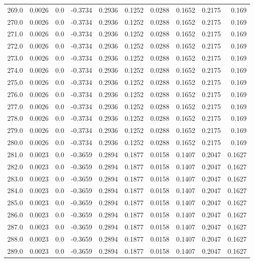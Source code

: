 \begin{longtable}{lrrrrrrrrr}
269.0 & 0.0026 & 0.0 & -0.3734 & 0.2936 & 0.1252 & 0.0288 & 0.1652 & 0.2175 & 0.169 \\
270.0 & 0.0026 & 0.0 & -0.3734 & 0.2936 & 0.1252 & 0.0288 & 0.1652 & 0.2175 & 0.169 \\
271.0 & 0.0026 & 0.0 & -0.3734 & 0.2936 & 0.1252 & 0.0288 & 0.1652 & 0.2175 & 0.169 \\
272.0 & 0.0026 & 0.0 & -0.3734 & 0.2936 & 0.1252 & 0.0288 & 0.1652 & 0.2175 & 0.169 \\
273.0 & 0.0026 & 0.0 & -0.3734 & 0.2936 & 0.1252 & 0.0288 & 0.1652 & 0.2175 & 0.169 \\
274.0 & 0.0026 & 0.0 & -0.3734 & 0.2936 & 0.1252 & 0.0288 & 0.1652 & 0.2175 & 0.169 \\
275.0 & 0.0026 & 0.0 & -0.3734 & 0.2936 & 0.1252 & 0.0288 & 0.1652 & 0.2175 & 0.169 \\
276.0 & 0.0026 & 0.0 & -0.3734 & 0.2936 & 0.1252 & 0.0288 & 0.1652 & 0.2175 & 0.169 \\
277.0 & 0.0026 & 0.0 & -0.3734 & 0.2936 & 0.1252 & 0.0288 & 0.1652 & 0.2175 & 0.169 \\
278.0 & 0.0026 & 0.0 & -0.3734 & 0.2936 & 0.1252 & 0.0288 & 0.1652 & 0.2175 & 0.169 \\
279.0 & 0.0026 & 0.0 & -0.3734 & 0.2936 & 0.1252 & 0.0288 & 0.1652 & 0.2175 & 0.169 \\
280.0 & 0.0026 & 0.0 & -0.3734 & 0.2936 & 0.1252 & 0.0288 & 0.1652 & 0.2175 & 0.169 \\
281.0 & 0.0023 & 0.0 & -0.3659 & 0.2894 & 0.1877 & 0.0158 & 0.1407 & 0.2047 & 0.1627 \\
282.0 & 0.0023 & 0.0 & -0.3659 & 0.2894 & 0.1877 & 0.0158 & 0.1407 & 0.2047 & 0.1627 \\
283.0 & 0.0023 & 0.0 & -0.3659 & 0.2894 & 0.1877 & 0.0158 & 0.1407 & 0.2047 & 0.1627 \\
284.0 & 0.0023 & 0.0 & -0.3659 & 0.2894 & 0.1877 & 0.0158 & 0.1407 & 0.2047 & 0.1627 \\
285.0 & 0.0023 & 0.0 & -0.3659 & 0.2894 & 0.1877 & 0.0158 & 0.1407 & 0.2047 & 0.1627 \\
286.0 & 0.0023 & 0.0 & -0.3659 & 0.2894 & 0.1877 & 0.0158 & 0.1407 & 0.2047 & 0.1627 \\
287.0 & 0.0023 & 0.0 & -0.3659 & 0.2894 & 0.1877 & 0.0158 & 0.1407 & 0.2047 & 0.1627 \\
288.0 & 0.0023 & 0.0 & -0.3659 & 0.2894 & 0.1877 & 0.0158 & 0.1407 & 0.2047 & 0.1627 \\
289.0 & 0.0023 & 0.0 & -0.3659 & 0.2894 & 0.1877 & 0.0158 & 0.1407 & 0.2047 & 0.1627 \\

\end{longtable}
